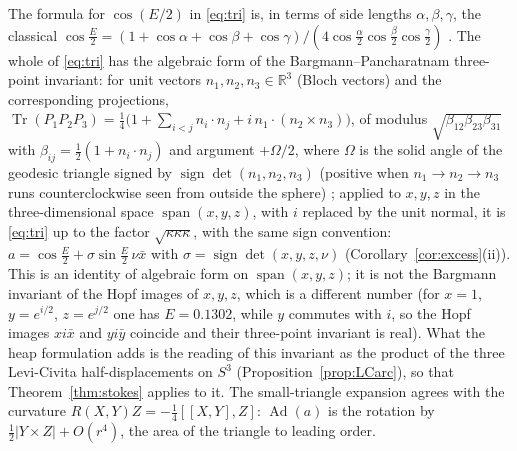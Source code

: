 \documentclass[11pt,reqno]{amsart}
\theoremstyle{definition}
\theoremstyle{remark}
\numberwithin{equation}{section}
\newcommand{\R}{\mathbb{R}}
\newcommand{\Ad}{\operatorname{Ad}}
\begin{document}
The formula for $\cos(E/2)$ in \eqref{eq:tri} is, in terms of side lengths $\alpha,\beta,\gamma$, the classical
$\cos\frac E2=(1+\cos\alpha+\cos\beta+\cos\gamma)/(4\cos\frac\alpha2\cos\frac\beta2\cos\frac\gamma2)$
\cite{Todhunter}.  The whole of \eqref{eq:tri} has the algebraic form of the Bargmann--Pancharatnam three-point invariant: for
unit vectors $n_1,n_2,n_3\in\R^3$ (Bloch vectors) and the corresponding projections,
$\operatorname{Tr}(P_1P_2P_3)=\tfrac14\bigl(1+\sum_{i<j}n_i\cdot n_j+i\,n_1\cdot(n_2\times n_3)\bigr)$, of modulus $\sqrt{\beta_{12}\beta_{23}\beta_{31}}$ with
$\beta_{ij}=\tfrac12(1+n_i\cdot n_j)$
and argument $+\Omega/2$, where $\Omega$ is the solid angle of the geodesic triangle signed by $\operatorname{sign}\det(n_1,n_2,n_3)$
(positive when $n_1\to n_2\to n_3$ runs counterclockwise seen from outside the sphere) \cite{SB88,MS93}; applied to $x,y,z$ in the three-dimensional space $\operatorname{span}(x,y,z)$, with $i$
replaced by the unit normal, it is \eqref{eq:tri} up to the factor $\sqrt{\kappa\kappa\kappa}$, with the same sign convention:
$a=\cos\frac E2+\sigma\sin\frac E2\,\nu\bar x$ with $\sigma=\operatorname{sign}\det(x,y,z,\nu)$ (Corollary~\ref{cor:excess}(ii)).  This is an identity of
algebraic form on $\operatorname{span}(x,y,z)$; it is not the Bargmann invariant of the Hopf images of $x,y,z$, which is a different number
(for $x=1$, $y=e^{i/2}$, $z=e^{j/2}$ one has $E=0.1302$, while $y$ commutes with $i$, so the Hopf images $xi\bar x$ and $yi\bar y$ coincide and their
three-point invariant is real).  What the heap formulation adds is
the reading of this invariant as the product of the three Levi-Civita half-displacements on $S^3$
(Proposition~\ref{prop:LCarc}), so that Theorem~\ref{thm:stokes} applies to it.  The small-triangle expansion agrees with the curvature $R(X,Y)Z=-\tfrac14[[X,Y],Z]$: $\Ad(a)$ is
the rotation by $\tfrac12\lvert Y\times Z\rvert+O(r^4)$, the area of the triangle to leading order.
\end{document}
